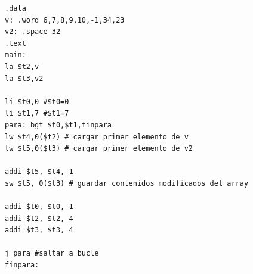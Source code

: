 \documentclass[11pt]{article}
\begin{document}
\begin{large}
\begin{flushleft}
\begin{listing}[h]
\begin{verbatim}
.data
v: .word 6,7,8,9,10,-1,34,23
v2: .space 32
.text
main: 
la $t2,v
la $t3,v2

li $t0,0 #$t0=0
li $t1,7 #$t1=7
para: bgt $t0,$t1,finpara
lw $t4,0($t2) # cargar primer elemento de v
lw $t5,0($t3) # cargar primer elemento de v2

addi $t5, $t4, 1
sw $t5, 0($t3) # guardar contenidos modificados del array

addi $t0, $t0, 1
addi $t2, $t2, 4
addi $t3, $t3, 4

j para #saltar a bucle
finpara: 

\end{verbatim}
\end{listing}


\end{flushleft}
\end{large}
\end{document}
